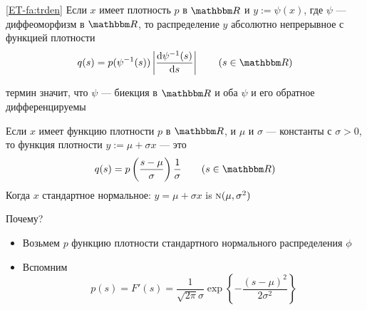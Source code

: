 \begin{frame}

    \vspace{2em}
    \Fact\eqref{ET-fa:trden}
    Если $x$ имеет плотность $p$ в $\RR$ и $y := \psi(x)$, где $\psi$ ---
    диффеоморфизм в $\RR$, то распределение $y$ абсолютно
    непрерывное с функцией плотности
    \begin{equation*}
        \label{eq:trden}
        q(s) = p(\psi^{-1}(s)) \left| \frac{\diff \psi^{-1}(s)}{\diff s} \right|
                 \qquad (s \in \RR)
    \end{equation*}
    
    
    \vspace{1em}
    термин  значит, что $\psi$ --- биекция в
    $\RR$ и оба $\psi$ и его обратное дифференцируемы
    
\end{frame}

\begin{frame}

    \vspace{2em}
    \Eg
    Если $x$ имеет функцию плотности $p$ в $\RR$, и $\mu$ и $\sigma$ --- константы с 
    $\sigma > 0$, то функция плотности $y := \mu + \sigma x$ --- это
    \begin{equation*}
        q(s) = p \left( \frac{s - \mu}{\sigma} \right) 
                 \frac{1}{\sigma} 
                 \qquad (s \in \RR)
    \end{equation*}
    Когда $x$ стандартное нормальное: $y = \mu
    + \sigma x$ is $\textrm{\sc n}(\mu, \sigma^2)$
    
    Почему?
    \begin{itemize}
        \item Возьмем $p$ функцию плотности стандартного нормального распределения $\phi$
        \item Вспомним%
            \begin{equation*}
                p(s) = F'(s) = 
                \frac{1}{\sqrt{2 \pi} \sigma}
                   \exp \left\{ - 
                       \frac{(s - \mu)^2}{2\sigma^2} \right\} 
            \end{equation*}
    \end{itemize}
    
\end{frame}

